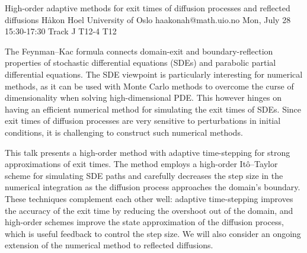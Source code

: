 \begin{talk}
  {High-order adaptive methods for exit times of diffusion processes and reflected diffusions}%
  {H{\aa}kon Hoel}%
  {University of Oslo}%
  {haakonah@math.uio.no}%
  {}%
  {}%
  {Mon, July 28 15:30-17:30 Track J}%
  {T12-4}%
  {T12}%
  {}%
  
				
			
\medskip
The Feynman--Kac formula connects domain-exit and boundary-reflection properties of stochastic differential equations (SDEs) and parabolic partial differential equations. The SDE viewpoint is particularly interesting for numerical methods, as it can be used with Monte Carlo methods to overcome the curse of dimensionality when solving high-dimensional PDE. This however hinges on having an efficient numerical method for simulating the exit times of SDEs. Since exit times of diffusion processes are very sensitive to perturbations in initial conditions, it is challenging to construct such numerical methods.

This talk presents a high-order method with adaptive time-stepping for strong approximations of exit times. The method employs a high-order Itô--Taylor scheme for simulating SDE paths and carefully decreases the step size in the numerical integration as the diffusion process approaches the domain's boundary. These techniques complement each other well: adaptive time-stepping improves the accuracy of the exit time by reducing the overshoot out of the domain, and high-order schemes improve the state approximation of the diffusion process, which is useful feedback to control the step size. We will also consider an ongoing extension of the numerical method to reflected diffusions.

\end{talk}

